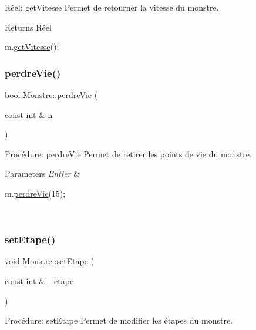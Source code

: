 Réel\+: get\+Vitesse Permet de retourner la vitesse du monstre. 

\begin{DoxyReturn}{Returns}
Réel 
\begin{DoxyCode}
m.\hyperlink{classMonstre_a8f94de3aed809fd81f283afce7c3feba}{getVitesse}();
\end{DoxyCode}
 
\end{DoxyReturn}
\mbox{\label{classMonstre_af6d0a1f276465d12d50db387855e62d3}} 
\subsubsection{\texorpdfstring{perdre\+Vie()}{perdreVie()}}
{\footnotesize\ttfamily bool Monstre\+::perdre\+Vie (\begin{DoxyParamCaption}\item[{const int \&}]{n }\end{DoxyParamCaption})}



Procédure\+: perdre\+Vie Permet de retirer les points de vie du monstre. 


\begin{DoxyParams}{Parameters}
{\em Entier} & 
\begin{DoxyCode}
m.\hyperlink{classMonstre_af6d0a1f276465d12d50db387855e62d3}{perdreVie}(15);
\end{DoxyCode}
 \\
\hline
\end{DoxyParams}
\mbox{\label{classMonstre_a51895539b2db4bd6e267e0ac5a1729ce}} 
\subsubsection{\texorpdfstring{set\+Etape()}{setEtape()}}
{\footnotesize\ttfamily void Monstre\+::set\+Etape (\begin{DoxyParamCaption}\item[{const int \&}]{\+\_\+etape }\end{DoxyParamCaption})}



Procédure\+: set\+Etape Permet de modifier les étapes du monstre. 


